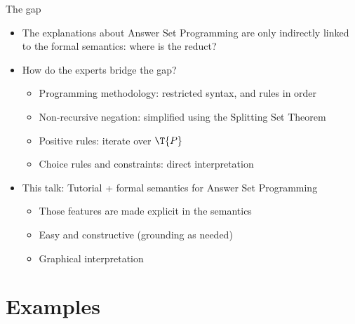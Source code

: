 \begin{frame}{The gap}
\begin{itemize}
  \item<1-> The explanations about Answer Set Programming are 
        only indirectly linked to the formal semantics:
        \alert<1>{where is the reduct?}
  \bigskip
  \item<2-> How do \alert<2>{the experts} bridge the gap?
  \begin{itemize}
    \item Programming methodology: restricted syntax, and rules in order
    \item Non-recursive negation: simplified using the Splitting Set Theorem
    \item Positive rules: iterate over $\T{P}$ 
    \item Choice rules and constraints: direct interpretation
  \end{itemize}
  \bigskip 
  \item<3-> \alert<3>{This talk:}
  Tutorial + formal semantics for Answer Set Programming
  \begin{itemize}
    \item Those features are made explicit in the semantics
    \item Easy and constructive (grounding as needed) 
    \item Graphical interpretation
  \end{itemize}
\end{itemize}
\end{frame}

\section{Examples}

